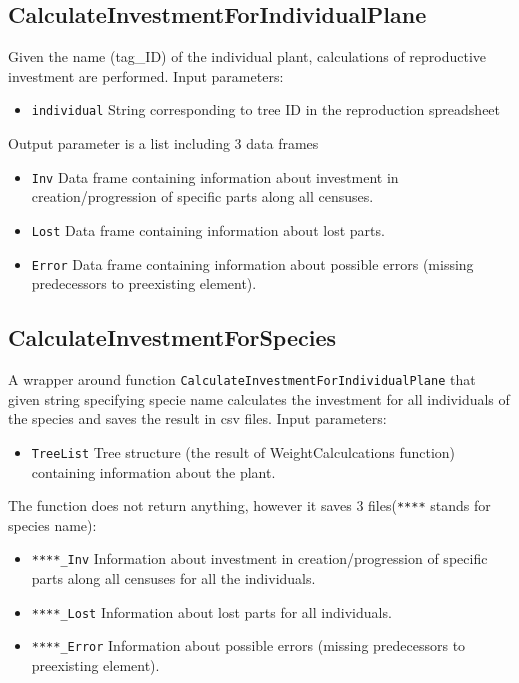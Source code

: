 \documentclass[10pt]{book} %
\begin{document}
\subsection*{CalculateInvestmentForIndividualPlane}
Given the name (tag\_ID) of the individual plant, calculations of reproductive investment are performed.
Input parameters:
\begin{itemize}
\item \texttt{individual}  String corresponding to tree ID in the reproduction spreadsheet
\end{itemize}
Output parameter is a list including 3 data frames
\begin{itemize}
\item \texttt{Inv} Data frame containing information about investment in creation/progression of specific parts along all censuses.
\item \texttt{Lost} Data frame containing information about lost parts.
\item \texttt{Error} Data frame containing information about possible errors (missing predecessors to preexisting element).
\end{itemize}

\subsection*{CalculateInvestmentForSpecies}
A wrapper around function \texttt{CalculateInvestmentForIndividualPlane} that given string specifying specie name calculates the investment for all individuals of the species and saves the result in csv files.
Input parameters:
\begin{itemize}
\item \texttt{TreeList}  Tree structure (the result of WeightCalculcations function) containing information about the plant.
\end{itemize}
The function does not return anything, however it saves 3 files(\texttt{****} stands for species name):
\begin{itemize}
\item \texttt{****\_Inv} Information about investment in creation/progression of specific parts along all censuses for all the individuals.
\item \texttt{****\_Lost} Information about lost parts for all individuals.
\item \texttt{****\_Error} Information about possible errors (missing predecessors to preexisting element).
\end{itemize}
\end{document}
